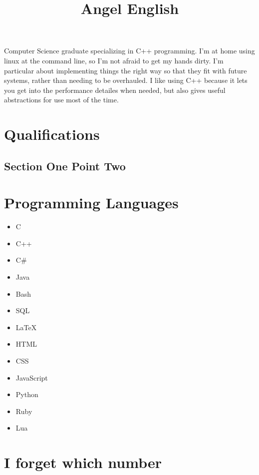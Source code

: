 \documentclass{amsart}
\title{Angel English}
\theoremstyle{definition} %
\begin{document}
\maketitle

Computer Science graduate specializing in C++ programming.
I'm at home using linux at the command line, so I'm not afraid to get
my hands dirty. I'm particular about implementing things the right
way so that they fit with future systems, rather than needing to be
overhauled. I like using C++ because it lets you get into the
performance detailes when needed, but also gives useful abstractions
for use most of the time.

\tableofcontents

\section{Qualifications}

\subsection{Section One Point Two}

\section{Programming Languages}

\begin{itemize}
	\item C
	\item C++
	\item C\#
	\item Java
	\item Bash
	\item SQL
	\item \LaTeX
	\item HTML
	\item CSS
	\item JavaScript
	\item Python
	\item Ruby
	\item Lua
\end{itemize}


\section{I forget which number}





\appendix

\begin{thebibliography}{99}


\end{thebibliography}
\end{document}
